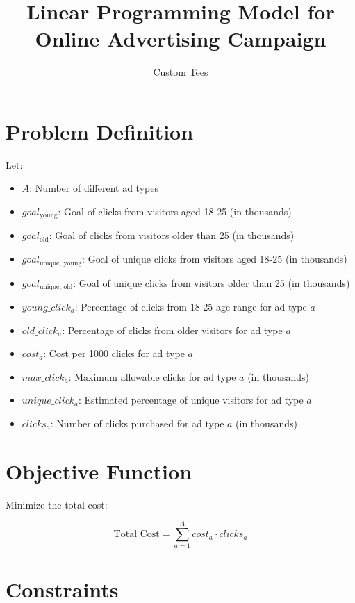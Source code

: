 \documentclass{article}
\begin{document}
\title{Linear Programming Model for Online Advertising Campaign}
\author{Custom Tees}
\date{}
\maketitle

\section*{Problem Definition}

Let:
\begin{itemize}
    \item \( A \): Number of different ad types
    \item \( goal_{\text{young}} \): Goal of clicks from visitors aged 18-25 (in thousands)
    \item \( goal_{\text{old}} \): Goal of clicks from visitors older than 25 (in thousands)
    \item \( goal_{\text{unique, young}} \): Goal of unique clicks from visitors aged 18-25 (in thousands)
    \item \( goal_{\text{unique, old}} \): Goal of unique clicks from visitors older than 25 (in thousands)
    \item \( young\_click_a \): Percentage of clicks from 18-25 age range for ad type \( a \)
    \item \( old\_click_a \): Percentage of clicks from older visitors for ad type \( a \)
    \item \( cost_a \): Cost per 1000 clicks for ad type \( a \)
    \item \( max\_click_a \): Maximum allowable clicks for ad type \( a \) (in thousands)
    \item \( unique\_click_a \): Estimated percentage of unique visitors for ad type \( a \)
    \item \( clicks_a \): Number of clicks purchased for ad type \( a \) (in thousands)
\end{itemize}

\section*{Objective Function}

Minimize the total cost:

\[
\text{Total Cost} = \sum_{a=1}^{A} cost_a \cdot clicks_a
\]

\section*{Constraints}
\end{document}

